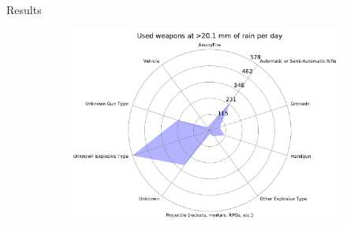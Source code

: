 \documentclass{beamer}
\begin{document}
\begin{frame}{Results}
\begin{figure}
\begin{subfigure}[b]{0.3\textwidth}
			\includegraphics[width=\textwidth]{Rain-Weapon/rain>201_starDiagram}
		\end{subfigure}
	\end{figure}
	
\end{frame}
\end{document}
